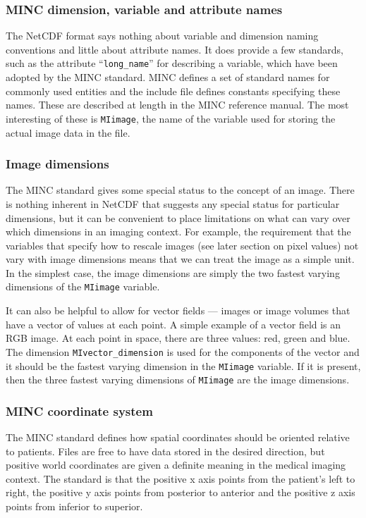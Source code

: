 \subsubsection{MINC dimension, variable and attribute names}

The NetCDF format says nothing about variable and dimension naming
conventions and little about attribute names. It does provide a few
standards, such as the attribute ``\verb+long_name+'' for describing a
variable, which have been adopted by the MINC standard. MINC defines a
set of standard names for commonly used entities and the include file
defines constants specifying these names. These are described at
length in the MINC reference manual. The most interesting of these is
\verb+MIimage+, the name of the variable used for storing the actual image
data in the file.

\subsubsection{Image dimensions}

The MINC standard gives some special status to the concept of an
image. There is nothing inherent in NetCDF that suggests any special
status for particular dimensions, but it can be convenient to place
limitations on what can vary over which dimensions in an imaging
context. For example, the requirement that the variables that specify
how to rescale images (see later section on pixel values) not vary
with image dimensions means that we can treat the image as a simple
unit. In the simplest case, the image dimensions are simply the two
fastest varying dimensions of the \verb+MIimage+ variable.

It can also be helpful to allow for vector fields --- images or image
volumes that have a vector of values at each point. A simple example
of a vector field is an RGB image. At each point in space, there are
three values: red, green and blue. The dimension
\verb+MIvector_dimension+ is used for the components of the vector and
it should be the fastest varying dimension in the \verb+MIimage+ variable. If
it is present, then the three fastest varying dimensions of \verb+MIimage+
are the image dimensions.

\subsubsection{MINC coordinate system}

The MINC standard defines how spatial coordinates should be oriented
relative to patients. Files are free to have data stored in the
desired direction, but positive world coordinates are given a definite
meaning in the medical imaging context. The standard is that the
positive x axis points from the patient's left to right, the positive
y axis points from posterior to anterior and the positive z axis
points from inferior to superior.

